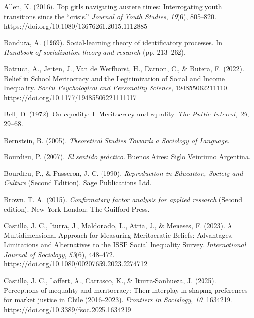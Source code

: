 \documentclass[
  13pt,
]{article}
\newlength{\cslhangindent}
\newenvironment{CSLReferences}[2] %
 {\begin{list}{}{%
  \setlength{\itemindent}{0pt}
  \setlength{\leftmargin}{0pt}
  \setlength{\parsep}{0pt}
  \ifodd #1
   \setlength{\leftmargin}{\cslhangindent}
   \setlength{\itemindent}{-1\cslhangindent}
  \fi
  \setlength{\itemsep}{#2\baselineskip}}}
 {\end{list}}
\begin{document}
\label{refs}
\begin{CSLReferences}{1}{0}
Allen, K. (2016). Top girls navigating austere times: Interrogating
youth transitions since the {``crisis.''} \emph{Journal of Youth
Studies}, \emph{19}(6), 805--820.
\url{https://doi.org/10.1080/13676261.2015.1112885}

Bandura, A. (1969). Social-learning theory of identificatory processes.
In \emph{Handbook of socialization theory and research} (pp. 213--262).

Batruch, A., Jetten, J., Van de Werfhorst, H., Darnon, C., \& Butera, F.
(2022). Belief in {School Meritocracy} and the {Legitimization} of
{Social} and {Income Inequality}. \emph{Social Psychological and
Personality Science}, 194855062211110.
\url{https://doi.org/10.1177/19485506221111017}

Bell, D. (1972). On equality: {I}. {Meritocracy} and equality. \emph{The
Public Interest}, \emph{29}, 29--68.

Bernstein, B. (2005). \emph{Theoretical {Studies Towards} a {Sociology}
of {Language}}.

Bourdieu, P. (2007). \emph{{El sentido práctico}}. Buenos Aires: Siglo
Veintiuno Argentina.

Bourdieu, P., \& Passeron, J. C. (1990). \emph{Reproduction in
{Education}, {Society} and {Culture}} (Second Edition). Sage
Publications Ltd.

Brown, T. A. (2015). \emph{Confirmatory factor analysis for applied
research} (Second edition). New York London: The Guilford Press.

Castillo, J. C., Iturra, J., Maldonado, L., Atria, J., \& Meneses, F.
(2023). A {Multidimensional Approach} for {Measuring Meritocratic
Beliefs}: {Advantages}, {Limitations} and {Alternatives} to the {ISSP
Social Inequality Survey}. \emph{International Journal of Sociology},
\emph{53}(6), 448--472.
\url{https://doi.org/10.1080/00207659.2023.2274712}

Castillo, J. C., Laffert, A., Carrasco, K., \& Iturra-Sanhueza, J.
(2025). Perceptions of inequality and meritocracy: Their interplay in
shaping preferences for market justice in {Chile} (2016--2023).
\emph{Frontiers in Sociology}, \emph{10}, 1634219.
\url{https://doi.org/10.3389/fsoc.2025.1634219}


\end{CSLReferences}
\end{document}
